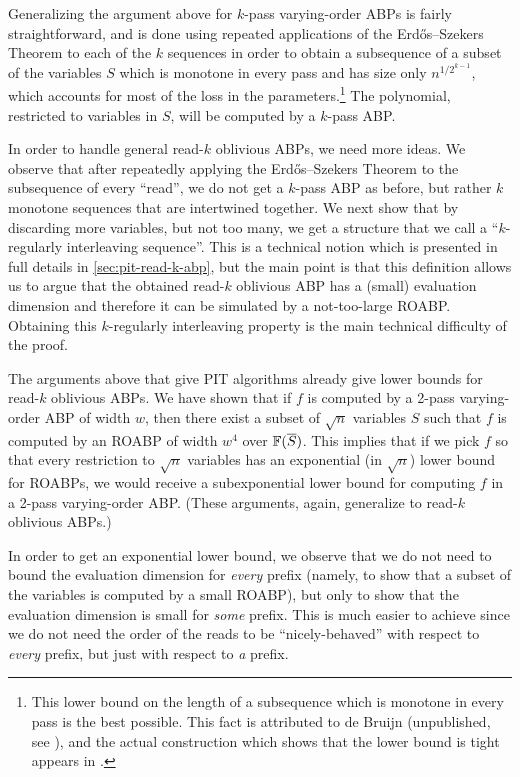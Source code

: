 \documentclass[11pt]{article}
\begin{document}
Generalizing the argument above for $k$-pass varying-order ABPs is fairly straightforward, and is done using repeated applications of the Erd\H{o}s--Szekers Theorem to each of the $k$ sequences in order to obtain a subsequence of a subset of the variables $S$ which is monotone in every pass and has size only $n^{1/2^{k-1}}$, which accounts for most of the loss in the parameters.\footnote{This lower bound on the length of a subsequence which is monotone in every pass is the best possible. This fact is attributed to de Bruijn (unpublished, see \cite{Kru53}), and the actual construction which shows that the lower bound is tight appears in \cite{AFK85}.} The polynomial, restricted to variables in $S$, will be computed by a $k$-pass ABP.

In order to handle general read-$k$ oblivious ABPs, we need more ideas. We observe that after repeatedly applying the Erd\H{o}s--Szekers Theorem to the subsequence of every ``read'', we do not get  a $k$-pass ABP as before, but rather $k$ monotone sequences that are intertwined together. We next show that by discarding more variables, but not too many, we get a structure that we call a ``$k$-regularly interleaving sequence''. This is a  technical notion which is presented in full details in \autoref{sec:pit-read-k-abp}, but the main point is that this definition allows us to argue that the obtained read-$k$ oblivious ABP has a (small) evaluation dimension and therefore it can be simulated by a not-too-large ROABP. Obtaining this $k$-regularly interleaving property is the main technical difficulty of the proof.

\medskip

The arguments above that give PIT algorithms already give lower bounds for read-$k$ oblivious ABPs.  We have shown that if $f$ is computed by a 2-pass varying-order ABP of width $w$, then there exist a subset of $\sqrt{n}$ variables $S$ such that $f$ is computed by an ROABP of width $w^4$ over $\F(\overline{S})$. This implies that if we pick $f$ so that every restriction to $\sqrt{n}$ variables has an exponential (in $\sqrt{n}$) lower bound for ROABPs, we would receive a subexponential lower bound for computing $f$ in a 2-pass varying-order ABP.  (These arguments, again, generalize to read-$k$ oblivious ABPs.)

In order to get an exponential lower bound, we observe that we do not need to bound the evaluation dimension for {\em every} prefix (namely, to show that a subset of the variables is computed by a small ROABP), but only to show that the evaluation dimension is small for {\em some} prefix. This is much easier to achieve since we do not need the order of the reads to be ``nicely-behaved'' with respect to {\em every} prefix, but just with respect to {\em a} prefix.
\end{document}
